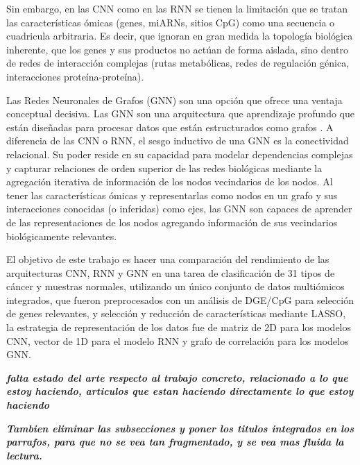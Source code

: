 \documentclass[review,12pt,times,number]{elsarticle}
\begin{document}
Sin embargo, en las CNN como en las RNN se tienen la limitación que se tratan las características ómicas (genes, miARNs, sitios CpG) como una secuencia o cuadricula arbitraria. Es decir, que ignoran en gran medida la topología biológica inherente, que los genes y sus productos no actúan de forma aislada, sino dentro de redes de interacción complejas (rutas metabólicas, redes de regulación génica, interacciones proteína-proteína).

Las Redes Neuronales de Grafos (GNN) son una opción que ofrece una ventaja conceptual decisiva. Las GNN son una arquitectura que aprendizaje profundo que están diseñadas para procesar datos que están estructurados como grafos \cite{jiang2019semi,velickovic2017graph}. A diferencia de las CNN o RNN, el sesgo inductivo de una GNN es la conectividad relacional. Su poder reside en su capacidad para modelar dependencias complejas y capturar relaciones de orden superior de las redes biológicas mediante la agregación iterativa de información de los nodos vecindarios de los nodos. Al tener las características ómicas y representarlas como nodos en un grafo y sus interacciones conocidas (o inferidas) como ejes, las GNN son capaces de aprender de las representaciones de los nodos agregando información de sus vecindarios biológicamente relevantes. 

El objetivo de este trabajo es hacer una comparación del rendimiento de las arquitecturas CNN, RNN y GNN en una tarea de clasificación de 31 tipos de cáncer y muestras normales, utilizando un único conjunto de datos multiómicos integrados, que fueron preprocesados con un análisis de DGE/CpG para selección de genes relevantes, y selección y reducción de características mediante LASSO, la estrategia de representación de los datos fue de matriz de 2D para los modelos CNN, vector de 1D para el modelo RNN y grafo de correlación para los modelos GNN.

\textbf{\textit{falta estado del arte respecto al trabajo concreto, relacionado a lo que estoy haciendo, articulos que estan haciendo directamente lo que estoy haciendo}}

\textbf{\textit{Tambien eliminar las subsecciones y poner los titulos integrados en los parrafos, para que no se vea tan fragmentado, y se vea mas fluida la lectura.}}
\end{document}
